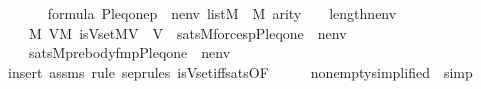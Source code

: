 \begin{isabellebody}
\ \ \isanewline
\ \ \ \ {\isachardoublequoteopen}{\isasymphi}{\isasymin}formula{\isachardoublequoteclose}\ {\isachardoublequoteopen}{\isacharbrackleft}{\kern0pt}P{\isacharcomma}{\kern0pt}leq{\isacharcomma}{\kern0pt}one{\isacharcomma}{\kern0pt}p{\isacharcomma}{\kern0pt}{\isasymrho}{\isacharcomma}{\kern0pt}{\isasympi}{\isacharbrackright}{\kern0pt}\ {\isacharat}{\kern0pt}\ nenv\ {\isasymin}list{\isacharparenleft}{\kern0pt}M{\isacharparenright}{\kern0pt}{\isachardoublequoteclose}\ \ {\isachardoublequoteopen}{\isasymalpha}{\isasymin}M{\isachardoublequoteclose}\ {\isachardoublequoteopen}arity{\isacharparenleft}{\kern0pt}{\isasymphi}{\isacharparenright}{\kern0pt}\ {\isasymle}\ {}\ {\isacharhash}{\kern0pt}{\isacharplus}{\kern0pt}\ length{\isacharparenleft}{\kern0pt}nenv{\isacharparenright}{\kern0pt}{\isachardoublequoteclose}\isanewline
\ \ \isanewline
\ \ \ \ {\isachardoublequoteopen}{\isacharparenleft}{\kern0pt}{\isasymexists}{\isasymtau}{\isasymin}M{\isachardot}{\kern0pt}\ {\isasymexists}V{\isasymin}M{\isachardot}{\kern0pt}\ is{\isacharunderscore}{\kern0pt}Vset{\isacharparenleft}{\kern0pt}{\isacharhash}{\kern0pt}{\isacharhash}{\kern0pt}M{\isacharcomma}{\kern0pt}{\isasymalpha}{\isacharcomma}{\kern0pt}V{\isacharparenright}{\kern0pt}\ {\isasymand}\ {\isasymtau}{\isasymin}V\ {\isasymand}\ sats{\isacharparenleft}{\kern0pt}M{\isacharcomma}{\kern0pt}forces{\isacharparenleft}{\kern0pt}{\isasymphi}{\isacharparenright}{\kern0pt}{\isacharcomma}{\kern0pt}{\isacharbrackleft}{\kern0pt}p{\isacharcomma}{\kern0pt}P{\isacharcomma}{\kern0pt}leq{\isacharcomma}{\kern0pt}one{\isacharcomma}{\kern0pt}{\isasymrho}{\isacharcomma}{\kern0pt}{\isasymtau}{\isacharbrackright}{\kern0pt}\ {\isacharat}{\kern0pt}\ nenv{\isacharparenright}{\kern0pt}{\isacharparenright}{\kern0pt}\isanewline
\ \ \ {\isasymlongleftrightarrow}\ sats{\isacharparenleft}{\kern0pt}M{\isacharcomma}{\kern0pt}{\isacharquery}{\kern0pt}prebody{\isacharunderscore}{\kern0pt}fm{\isacharcomma}{\kern0pt}{\isacharbrackleft}{\kern0pt}{\isasymrho}{\isacharcomma}{\kern0pt}p{\isacharcomma}{\kern0pt}{\isasymalpha}{\isacharcomma}{\kern0pt}P{\isacharcomma}{\kern0pt}leq{\isacharcomma}{\kern0pt}one{\isacharbrackright}{\kern0pt}\ {\isacharat}{\kern0pt}\ nenv{\isacharparenright}{\kern0pt}{\isachardoublequoteclose}\isanewline
%
\isadelimproof
\ \ %
\endisadelimproof
%
\isatagproof
{}\isamarkupfalse%
\ {\isacharparenleft}{\kern0pt}insert\ assms{\isacharsemicolon}{\kern0pt}\ {\isacharparenleft}{\kern0pt}rule\ sep{\isacharunderscore}{\kern0pt}rules\ is{\isacharunderscore}{\kern0pt}Vset{\isacharunderscore}{\kern0pt}iff{\isacharunderscore}{\kern0pt}sats{\isacharbrackleft}{\kern0pt}OF\ {\isacharunderscore}{\kern0pt}\ {\isacharunderscore}{\kern0pt}\ {\isacharunderscore}{\kern0pt}\ {\isacharunderscore}{\kern0pt}\ {\isacharunderscore}{\kern0pt}\ nonempty{\isacharbrackleft}{\kern0pt}simplified{\isacharbrackright}{\kern0pt}{\isacharbrackright}{\kern0pt}\ {\isacharbar}{\kern0pt}\ simp{\isacharparenright}{\kern0pt}{\isacharparenright}{\kern0pt}\isanewline

\end{isabellebody}
